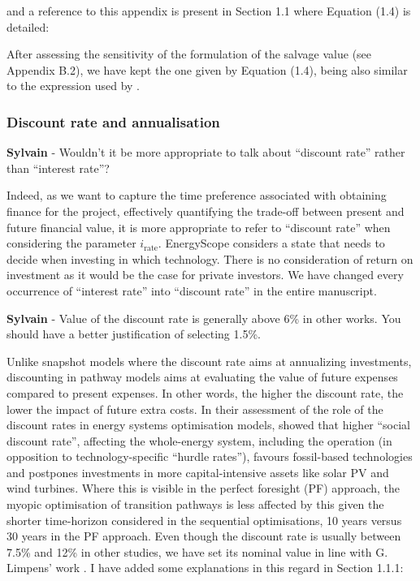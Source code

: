 \documentclass[12pt,a4paper]{article}
\begin{document}
\noindent and a reference to this appendix is present {\color{blue}in Section 1.1 where Equation (1.4) is detailed}:

\begin{mdframed}[style=manuscript] %
After assessing the sensitivity of the formulation of the salvage value (see Appendix B.2), we have kept the one given by Equation (1.4), being also similar to the expression used by \citet{prina2019transition}.
\end{mdframed}

\subsubsection{Discount rate and annualisation}

\begin{mdframed}[style=comment] %
{\color{purple} \textbf{Sylvain}} - Wouldn't it be more appropriate to talk about ``discount rate'' rather than ``interest rate''?
\end{mdframed}

\noindent Indeed, as we want to capture the time preference associated with obtaining finance for the project, effectively quantifying the trade-off between present and future financial value, it is more appropriate to refer to ``discount rate'' when considering the parameter $i_{\text{rate}}$. EnergyScope considers a state that needs to decide when investing in which technology. There is no consideration of return on investment as it would be the case for private investors. We have changed every occurrence of ``interest rate'' into ``discount rate'' {\color{blue}in the entire manuscript}.

\begin{mdframed}[style=comment] %
{\color{purple} \textbf{Sylvain}} - Value of the discount rate is generally above 6\% in other works. You should have a better justification of selecting 1.5\%.
\end{mdframed}

\noindent Unlike snapshot models where the discount rate aims at annualizing investments, discounting in pathway models aims at evaluating the value of future expenses compared to present expenses. In other words, the higher the discount rate, the lower the impact of future extra costs. In their assessment of the role of the discount rates in energy systems optimisation models, \citet{garcia2016role} showed that higher ``social discount rate'', affecting the whole-energy system, including the operation (in opposition to technology-specific ``hurdle rates''), favours fossil-based technologies and postpones investments in more capital-intensive assets like solar PV and wind turbines. Where this is visible in the perfect foresight (PF) approach, the myopic optimisation of transition pathways is less affected by this given the shorter time-horizon considered in the sequential optimisations, 10 years versus 30 years in the PF approach. Even though the discount rate is usually between 7.5\% and 12\% in other studies, we have set its nominal value in line with G. Limpens' work \cite{limpens2021generating}. I have added some explanations in this regard {\color{blue}in Section 1.1.1}:
\end{document}
